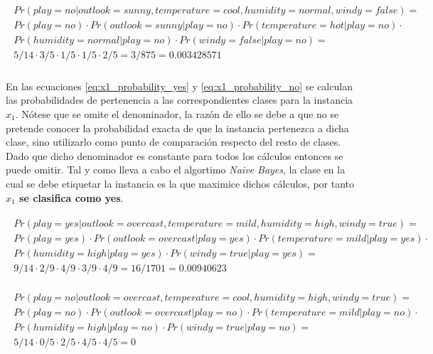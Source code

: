 \documentclass{article}
\begin{document}
		\begin{align}
		\label{eq:x1_probability_no}
			\begin{split}
			Pr(play = no | outlook = sunny, temperature = cool, humidity = normal, windy = false) = \\
			Pr(play = no) \cdot Pr(outlook = sunny | play = no) \cdot Pr(temperature = hot 	| play = no) \cdot \\
			Pr(humidity = normal 	| play = no) \cdot Pr(windy = false | play = no) =\\
			 5/14 \cdot 3/5 \cdot 1/5 \cdot 1/5 \cdot  2/5 = 3/875 = 0.003428571
		 \end{split}
		\end{align}

		\paragraph{}
		En las ecuaciones \eqref{eq:x1_probability_yes} y \eqref{eq:x1_probability_no} se calculan las probabilidades de pertenencia a las correspondientes clases para la instancia $x_1$. Nótese que se omite el denominador, la razón de ello se debe a que no se pretende conocer la probabilidad exacta de que la instancia pertenezca a dicha clase, sino utilizarlo como punto de comparación respecto del resto de clases. Dado que dicho denominador es constante para todos los cálculos entonces se puede omitir. Tal y como lleva a cabo el algortimo \emph{Naive Bayes}, la clase en la cual se debe etiquetar la instancia es la que maximice dichos cálculos, por tanto \textbf{$x_1$ se clasifica como yes}.

		\begin{align}
		\label{eq:x2_probability_yes}
			\begin{split}
				Pr(play = yes | outlook = overcast, temperature = mild, humidity = high, windy = true) = \\
				Pr(play = yes) \cdot Pr(outlook = overcast | play = yes) \cdot Pr(temperature = mild | play = yes) \cdot \\
				Pr(humidity = high 	| play = yes) \cdot Pr(windy = true 	| play = yes) = \\
				9/14 \cdot 2/9 \cdot 4/9 \cdot 3/9 \cdot 4/9 = 16/1701 = 0.00940623
			\end{split}
		\end{align}

		\begin{align}
		\label{eq:x2_probability_no}
			\begin{split}
				Pr(play = no | outlook = overcast, temperature = cool, humidity = high, windy = true) = \\
				Pr(play = no) \cdot Pr(outlook = overcast | play = no) \cdot Pr(temperature = mild | play = no) \cdot \\
				Pr(humidity = high 	| play = no) \cdot Pr(windy = true | play = no) =\\
				5/14 \cdot 0/5 \cdot 2/5 \cdot 4/5 \cdot  4/5 = 0
			\end{split}
		\end{align}
\end{document}
